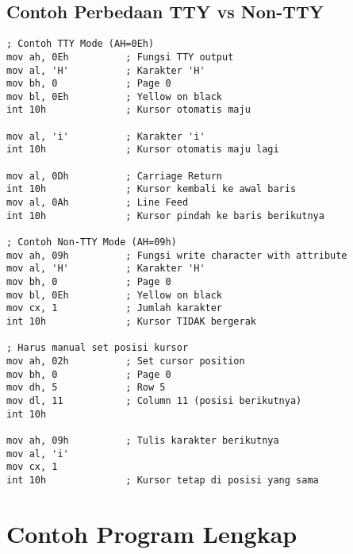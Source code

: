 \documentclass[../main.tex]{subfiles}
\begin{document}
        \subsection{Contoh Perbedaan TTY vs Non-TTY}
            \begin{lstlisting}[language={[x86masm]Assembler}, caption=Perbandingan TTY vs Non-TTY, label={lst:tty-comparison}]
; Contoh TTY Mode (AH=0Eh)
mov ah, 0Eh          ; Fungsi TTY output
mov al, 'H'          ; Karakter 'H'
mov bh, 0            ; Page 0
mov bl, 0Eh          ; Yellow on black
int 10h              ; Kursor otomatis maju

mov al, 'i'          ; Karakter 'i'
int 10h              ; Kursor otomatis maju lagi

mov al, 0Dh          ; Carriage Return
int 10h              ; Kursor kembali ke awal baris
mov al, 0Ah          ; Line Feed
int 10h              ; Kursor pindah ke baris berikutnya

; Contoh Non-TTY Mode (AH=09h)
mov ah, 09h          ; Fungsi write character with attribute
mov al, 'H'          ; Karakter 'H'
mov bh, 0            ; Page 0
mov bl, 0Eh          ; Yellow on black
mov cx, 1            ; Jumlah karakter
int 10h              ; Kursor TIDAK bergerak

; Harus manual set posisi kursor
mov ah, 02h          ; Set cursor position
mov bh, 0            ; Page 0
mov dh, 5            ; Row 5
mov dl, 11           ; Column 11 (posisi berikutnya)
int 10h

mov ah, 09h          ; Tulis karakter berikutnya
mov al, 'i'
mov cx, 1
int 10h              ; Kursor tetap di posisi yang sama
            \end{lstlisting}

    \section{Contoh Program Lengkap}
\end{document}
